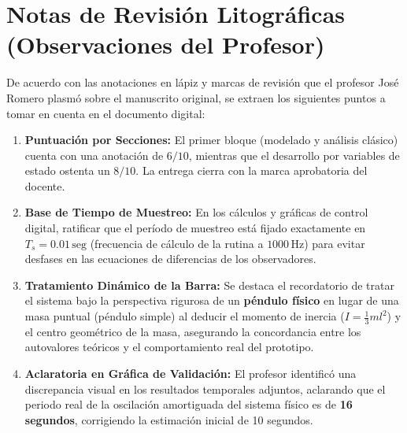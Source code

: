 \section{Notas de Revisión Litográficas (Observaciones del Profesor)}

De acuerdo con las anotaciones en lápiz y marcas de revisión que el profesor José Romero plasmó sobre el manuscrito original, se extraen los siguientes puntos a tomar en cuenta en el documento digital:

\begin{enumerate}
    \item \textbf{Puntuación por Secciones:} El primer bloque (modelado y análisis clásico) cuenta con una anotación de $6/10$, mientras que el desarrollo por variables de estado ostenta un $8/10$. La entrega cierra con la marca aprobatoria del docente.
    
    \item \textbf{Base de Tiempo de Muestreo:} En los cálculos y gráficas de control digital, ratificar que el período de muestreo está fijado exactamente en $T_s = 0.01 \, \text{seg}$ (frecuencia de cálculo de la rutina a $1000 \, \text{Hz}$) para evitar desfases en las ecuaciones de diferencias de los observadores.
    
    \item \textbf{Tratamiento Dinámico de la Barra:} Se destaca el recordatorio de tratar el sistema bajo la perspectiva rigurosa de un \textbf{péndulo físico} en lugar de una masa puntual (péndulo simple) al deducir el momento de inercia ($I = \frac{1}{3}ml^2$) y el centro geométrico de la masa, asegurando la concordancia entre los autovalores teóricos y el comportamiento real del prototipo.
    
    \item \textbf{Aclaratoria en Gráfica de Validación:} El profesor identificó una discrepancia visual en los resultados temporales adjuntos, aclarando que el periodo real de la oscilación amortiguada del sistema físico es de \textbf{16 segundos}, corrigiendo la estimación inicial de 10 segundos.
\end{enumerate}
